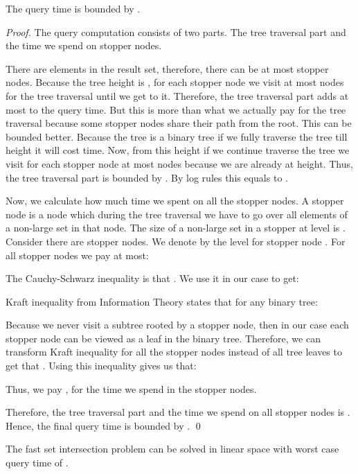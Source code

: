 \documentclass[10pt]{llncs}
\begin{document}
\begin{theorem}
The query time is bounded by .
\end{theorem}
\begin{proof}
The query computation consists of two parts.
The tree traversal part and the time we spend on stopper nodes.

There are  elements in the result set, therefore, there can be at most  stopper nodes.
Because the tree height is ,
for each stopper node we visit at most  nodes for the tree traversal until we get to it.
Therefore, the tree traversal part adds at most  to the query time.
But this is more than what we actually pay for the tree traversal
because some stopper nodes share their path from the root.
This can be bounded better.
Because the tree is a binary tree if we fully traverse the tree till  height
it will cost  time.
Now, from this height if we continue traverse the tree
we visit for each stopper node at most  nodes because we are already at  height.
Thus, the tree traversal part is bounded by .
By log rules this equals to .

Now, we calculate how much time we spent on all the stopper nodes.
A stopper node is a node which during the tree traversal we have to go over all elements of a non-large set in that node.
The size of a non-large set in a stopper at level  is .
Consider there are  stopper nodes.
We denote by  the level for stopper node .
For all stopper nodes we pay at most:

The Cauchy-Schwarz inequality is that .
We use it in our case to get:

Kraft inequality from Information Theory states that for any binary tree:

Because we never visit a subtree rooted by a stopper node,
then in our case each stopper node can be viewed as a leaf in the binary tree.
Therefore, we can transform Kraft inequality for all the stopper nodes
instead of all tree leaves to get that
.
Using this inequality gives us that:

Thus, we pay , for the time we spend in the stopper nodes.

Therefore, the tree traversal part and the time we spend on all stopper nodes is
.
Hence, the final query time is bounded by .
\qed
\end{proof}



\begin{corollary}
The fast set intersection problem can be solved in linear space with worst case query time of .
\end{corollary}
\end{document}
